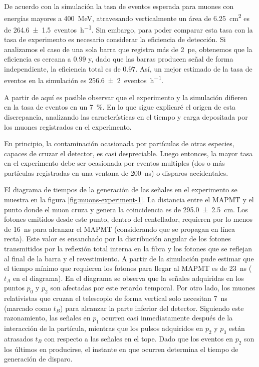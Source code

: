 De acuerdo con la simulación la tasa de eventos esperada para muones con energías mayores a \SI{400}{\mega\electronvolt}, atravesando verticalmente un área de \SI{6.25}{\cm\squared} es de \SI{264.6(15)}{eventos\per\hour}. Sin embargo, para poder comparar esta tasa con la tasa de experimento es necesario considerar la eficiencia de detección. Si analizamos el caso de una sola barra que registra más de \SI{2}{pe}, obtenemos que la eficiencia es cercana a $0.99$ y, dado que las barras producen señal de forma independiente, la eficiencia total es de $0.97$. Así, un mejor estimado de la tasa de eventos en la simulación es \SI{256.6(20)}{eventos\per\hour}.

A partir de aquí es posible observar que el experimento y la simulación difieren en la tasa de eventos en un \SI{7}{\percent}. En lo que sigue explicaré el origen de esta discrepancia, analizando las características en el tiempo y carga depositada por los muones registrados en el experimento.

En principio, la contaminación ocasionada por partículas de otras especies, capaces de cruzar el detector, es casi despreciable. Luego entonces, la mayor tasa en el experimento debe ser ocasionada por eventos multiples (dos o más partículas registradas en una ventana de \SI{200}{\ns}) o disparos accidentales.

El diagrama de tiempos de la generación de las señales en el experimento se muestra en la figura \ref{fig:muons-experiment-1}. La distancia entre el MAPMT y el punto donde el muon cruza y genera la coincidencia es de \SI{295.0(25)}{\cm}. Los fotones emitidos desde este punto, dentro del centellador, requieren por lo menos de \SI{16}{\ns} para alcanzar el MAPMT (considerando que se propagan en línea recta). Este valor es ensanchado por la distribución angular de los fotones transmitidos por la reflexión total interna en la fibra y los fotones que se reflejan al final de la barra y el revestimiento. A partir de la simulación pude estimar que el tiempo mínimo que requieren los fotones para llegar al MAPMT es de \SI{23}{\ns} ($t_{A}$ en el diagrama). En el diagrama se observa que la señales adquiridas en los puntos $p_{0}$ y $p_{2}$ son afectadas por este retardo temporal. Por otro lado, los muones relativistas que cruzan el telescopio de forma vertical solo necesitan \SI{7}{\ns} (marcado como $t_{B}$) para alcanzar la parte inferior del detector. Siguiendo este razonamiento, las señales en $p_{1}$ ocurren casi inmediatamente después de la interacción de la partícula, mientras que los pulsos adquiridos en $p_{2}$ y $p_{3}$ están atrasados $t_{B}$ con respecto a las señales en el tope. Dado que los eventos en $p_{2}$ son los últimos en producirse, el instante en que ocurren determina el tiempo de generación de disparo.

